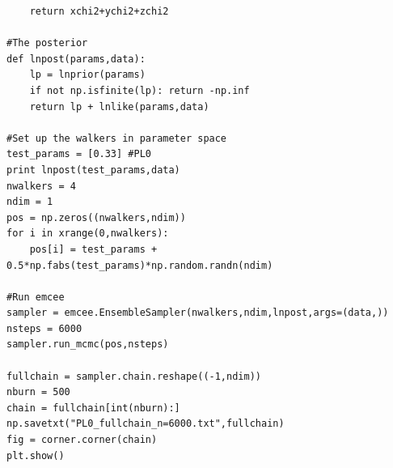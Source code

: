 \documentclass[a4paper,12pt, oneside]{article}
\begin{document}
\begin{verbatim}
    return xchi2+ychi2+zchi2

#The posterior
def lnpost(params,data):
    lp = lnprior(params)
    if not np.isfinite(lp): return -np.inf
    return lp + lnlike(params,data)

#Set up the walkers in parameter space
test_params = [0.33] #PL0
print lnpost(test_params,data)
nwalkers = 4
ndim = 1
pos = np.zeros((nwalkers,ndim))
for i in xrange(0,nwalkers):
    pos[i] = test_params + 0.5*np.fabs(test_params)*np.random.randn(ndim)

#Run emcee
sampler = emcee.EnsembleSampler(nwalkers,ndim,lnpost,args=(data,))
nsteps = 6000
sampler.run_mcmc(pos,nsteps)

fullchain = sampler.chain.reshape((-1,ndim))
nburn = 500
chain = fullchain[int(nburn):]
np.savetxt("PL0_fullchain_n=6000.txt",fullchain)
fig = corner.corner(chain)
plt.show()

\end{verbatim}
\end{document}

